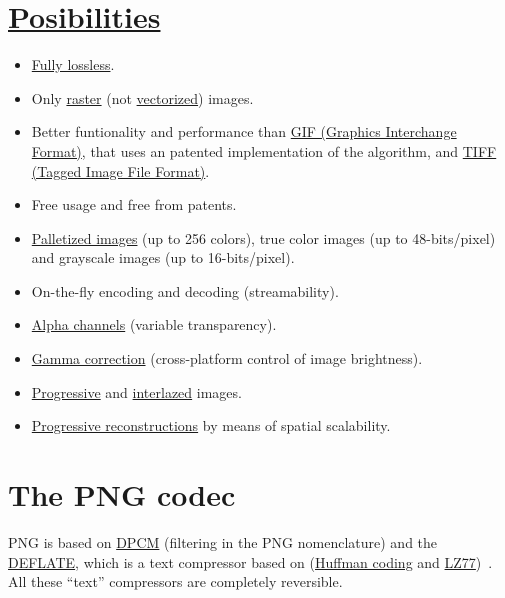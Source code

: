 \section{\href{http://www.libpng.org/pub/png/book/}{Posibilities}}
\begin{itemize}
\item \href{https://en.wikipedia.org/wiki/Lossless_compression}{Fully
  lossless}.
\item Only
  \href{https://en.wikipedia.org/wiki/Raster_graphics}{raster} (not
  \href{https://en.wikipedia.org/wiki/Vector_graphics}{vectorized})
  images.
\item Better funtionality and performance than
  \href{https://en.wikipedia.org/wiki/GIF}{GIF (Graphics Interchange
    Format)}, that uses an patented implementation of the
   algorithm, and
  \href{https://en.wikipedia.org/wiki/TIFF}{TIFF (Tagged Image File
    Format)}.
\item Free usage and free from patents.
\item
  \href{https://en.wikipedia.org/wiki/Palette_(computing)}{Palletized
    images} (up to 256 colors), true color images (up to
  48-bits/pixel) and grayscale images (up to 16-bits/pixel).
\item On-the-fly encoding and decoding (streamability).
\item \href{https://en.wikipedia.org/wiki/Alpha_compositing}{Alpha
  channels} (variable transparency).
\item \href{https://en.wikipedia.org/wiki/Gamma_correction}{Gamma
  correction} (cross-platform control of image brightness).
\item
  \href{https://en.wikipedia.org/wiki/Progressive_scan}{Progressive}
  and
  \href{https://en.wikipedia.org/wiki/Interlacing_(bitmaps)}{interlazed}
  images.
\item
  \href{http://www.libpng.org/pub/png/book/chapter08.html#png.ch08.div.6}{Progressive
    reconstructions} by means of spatial scalability.
\end{itemize} 

\section{The PNG codec}

PNG is based on
\href{https://en.wikipedia.org/wiki/Differential_pulse-code_modulation}{DPCM}
(filtering in the PNG nomenclature) and the
\href{https://en.wikipedia.org/wiki/DEFLATE}{DEFLATE}, which is a text
compressor based on
(\href{https://en.wikipedia.org/wiki/Huffman_coding}{Huffman coding}
and
\href{https://en.wikipedia.org/wiki/LZ77_and_LZ78}{LZ77})~\cite{nelson96datacompression}. All
these ``text'' compressors are completely reversible.

